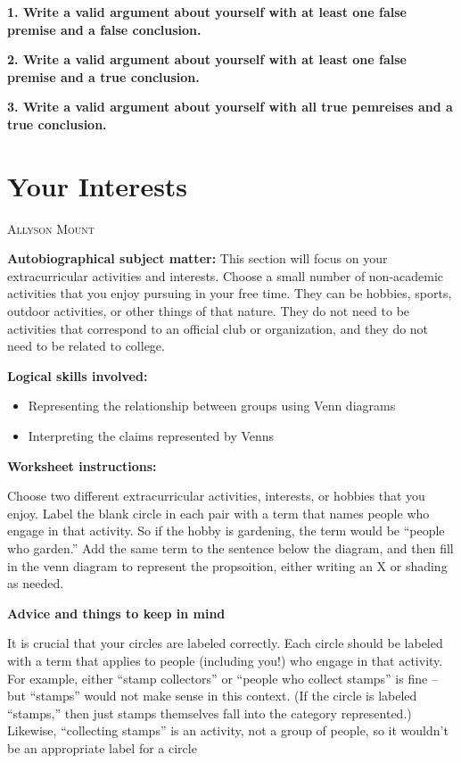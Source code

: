 \documentclass[oneside, openany]{book} %
\makeatletter
\newcommand\chapterauthor[1]{\authortoc{#1}\printchapterauthor{#1}}
\newcommand{\printchapterauthor}[1]{%
 {\parindent0pt\vspace*{-25pt}%
 \linespread{1.1}\large\scshape#1%
 \par\nobreak\vspace*{35pt}}
 \@afterheading%
}
\newcommand{\authortoc}[1]{%
 \addtocontents{toc}{\vskip-10pt}%
 \addtocontents{toc}{%
  \protect\contentsline{chapter}%
  {\hskip1.3em\mdseries\scshape\protect\scriptsize#1}{}{}}
 \addtocontents{toc}{\vskip5pt}%
}
\makeatother
\begin{document}
\noindent\textbf{1. Write a valid argument about yourself with at least one false premise and a false conclusion.}

\vfill

\noindent\textbf{2. Write a valid argument about yourself with at least one false premise and a true conclusion.}

\vfill

\noindent\textbf{3. Write a valid argument about yourself with all true pemreises and a true conclusion.}

\vfill

\chapter{Your Interests}
\chapterauthor{Allyson Mount}

\noindent \textbf{Autobiographical subject matter:  }This section will focus on your  extracurricular activities and interests. Choose a small number of non-academic activities that you enjoy pursuing in your free time. They can be hobbies, sports, outdoor activities, or other things of that nature. They do not need to be activities that correspond to an official club or organization, and they do not need to be related to college.

\noindent \textbf{Logical skills involved:}

 \begin{itemize}[label=\textbullet, topsep=0pt] 
\item Representing the relationship between groups using Venn diagrams
\item Interpreting the claims represented by Venns
\end{itemize}

\noindent \textbf{Worksheet instructions:}

 Choose two different extracurricular activities, interests, or hobbies that you enjoy. Label the blank circle in each pair with a term that names people who engage in that activity. So if the hobby is gardening, the term would be ``people who garden.'' Add the same term to the sentence below the diagram, and then fill in the venn diagram to represent the propsoition, either writing an X or shading as needed. 

\noindent \textbf{Advice and things to keep in mind}

\noindent It is crucial that your circles are labeled correctly. Each circle should be labeled with a term that applies to people (including you!) who engage in that activity. For example, either ``stamp collectors'' or ``people who collect stamps'' is fine -- but ``stamps'' would not make sense in this context. (If the circle is labeled ``stamps,'' then just stamps themselves fall into the category represented.) Likewise, ``collecting stamps'' is an activity, not a group of people, so it wouldn't be an appropriate label for a circle
\end{document}
